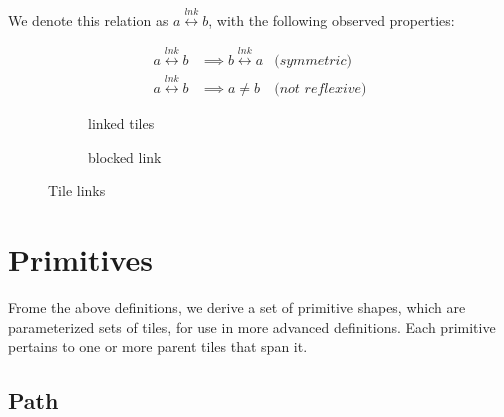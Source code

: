We denote this relation as \(a \overset{lnk}{\leftrightarrow} b\), with the following observed properties:

\begin{align*}
    a \overset{lnk}{\leftrightarrow} b &\implies
        b \overset{lnk}{\leftrightarrow} a&\textit{(symmetric)}\\
    a \overset{lnk}{\leftrightarrow} b &\implies
        a \neq b&\textit{(not reflexive)}
\end{align*}

\begin{figure}[htbp]
    \centering
    \begin{subfigure}{0.48\textwidth}
        \centering
        \caption{linked tiles}
    \end{subfigure}
    \begin{subfigure}{0.48\textwidth}
        \centering
        \caption{blocked link}
    \end{subfigure}
    \caption{Tile links}\label{fig:map_link}
\end{figure}

\section{Primitives}

Frome the above definitions, we derive a set of primitive shapes, which are parameterized sets of tiles, for use in more advanced definitions.
Each primitive pertains to one or more parent tiles that span it.

\subsection{Path}

